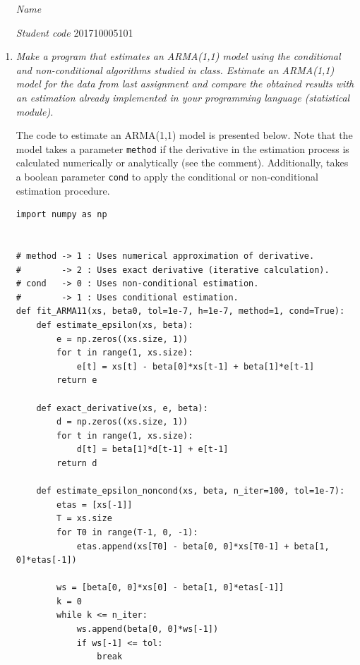 \documentclass[fleqn]{article}
\begin{document}
 \vspace{0.3cm}
   \begin{itemize}[leftmargin=6.25cm, labelsep=0.5cm]

     \item[\textit{Name}]  %
     \item[\textit{Student code}] 201710005101 %

   \end{itemize}
\vspace{0.3cm}

\begin{enumerate}
\item \textit{Make a program that estimates an ARMA(1,1) model using the conditional and non-conditional algorithms studied in class. Estimate an ARMA(1,1) model for the data from last assignment and compare the obtained results with an estimation already implemented in your programming language (statistical module).}

The code to estimate an ARMA(1,1) model is presented below. Note that the model takes a parameter \texttt{method} if the derivative in the estimation process is calculated numerically or analytically (see the comment). Additionally, takes a boolean parameter \texttt{cond} to apply the conditional or non-conditional estimation procedure.
\begin{verbatim}
import numpy as np


# method -> 1 : Uses numerical approximation of derivative.
#        -> 2 : Uses exact derivative (iterative calculation).
# cond   -> 0 : Uses non-conditional estimation.
#        -> 1 : Uses conditional estimation.
def fit_ARMA11(xs, beta0, tol=1e-7, h=1e-7, method=1, cond=True):
    def estimate_epsilon(xs, beta):
        e = np.zeros((xs.size, 1))
        for t in range(1, xs.size):
            e[t] = xs[t] - beta[0]*xs[t-1] + beta[1]*e[t-1]
        return e

    def exact_derivative(xs, e, beta):
        d = np.zeros((xs.size, 1))
        for t in range(1, xs.size):
            d[t] = beta[1]*d[t-1] + e[t-1]
        return d

    def estimate_epsilon_noncond(xs, beta, n_iter=100, tol=1e-7):
        etas = [xs[-1]]
        T = xs.size
        for T0 in range(T-1, 0, -1):
            etas.append(xs[T0] - beta[0, 0]*xs[T0-1] + beta[1, 0]*etas[-1])

        ws = [beta[0, 0]*xs[0] - beta[1, 0]*etas[-1]]
        k = 0
        while k <= n_iter:
            ws.append(beta[0, 0]*ws[-1])
            if ws[-1] <= tol:
                break


\end{verbatim}
\end{enumerate}
\end{document}
